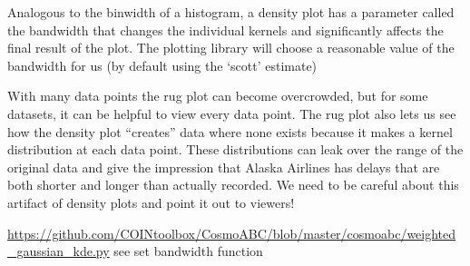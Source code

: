 Analogous to the binwidth of a histogram, a density plot has a parameter called the bandwidth that changes the individual kernels and significantly affects the final result of the plot. The plotting library will choose a reasonable value of the bandwidth for us (by default using the ‘scott’ estimate)

With many data points the rug plot can become overcrowded, but for some datasets, it can be helpful to view every data point. The rug plot also lets us see how the density plot “creates” data where none exists because it makes a kernel distribution at each data point. These distributions can leak over the range of the original data and give the impression that Alaska Airlines has delays that are both shorter and longer than actually recorded. We need to be careful about this artifact of density plots and point it out to viewers!


\url{https://github.com/COINtoolbox/CosmoABC/blob/master/cosmoabc/weighted_gaussian_kde.py} see set bandwidth function 
